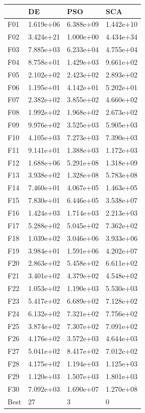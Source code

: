 \begin{tabular}{llll}
\toprule
{} &         DE &        PSO &        SCA \\
\midrule
F01  &  1.619e+06 &  6.388e+09 &  1.442e+10 \\
F02  &  3.424e+21 &  1.000e+00 &  4.434e+34 \\
F03  &  7.885e+03 &  6.233e+04 &  4.755e+04 \\
F04  &  8.758e+01 &  1.429e+03 &  9.661e+02 \\
F05  &  2.102e+02 &  2.423e+02 &  2.893e+02 \\
F06  &  1.195e+01 &  4.142e+01 &  5.202e+01 \\
F07  &  2.382e+02 &  3.855e+02 &  4.660e+02 \\
F08  &  1.992e+02 &  1.968e+02 &  2.673e+02 \\
F09  &  9.976e+02 &  3.525e+03 &  5.905e+03 \\
F10  &  4.105e+03 &  7.273e+03 &  7.390e+03 \\
F11  &  9.141e+01 &  1.388e+03 &  1.172e+03 \\
F12  &  1.688e+06 &  5.291e+08 &  1.318e+09 \\
F13  &  3.938e+02 &  1.328e+08 &  5.783e+08 \\
F14  &  7.460e+01 &  4.067e+05 &  1.463e+05 \\
F15  &  7.830e+01 &  6.446e+05 &  3.538e+07 \\
F16  &  1.424e+03 &  1.714e+03 &  2.213e+03 \\
F17  &  5.288e+02 &  5.045e+02 &  7.362e+02 \\
F18  &  1.039e+02 &  3.046e+06 &  3.933e+06 \\
F19  &  3.984e+01 &  1.591e+06 &  4.202e+07 \\
F20  &  2.863e+02 &  5.458e+02 &  6.611e+02 \\
F21  &  3.401e+02 &  4.379e+02 &  4.548e+02 \\
F22  &  1.053e+02 &  1.190e+03 &  5.530e+03 \\
F23  &  5.417e+02 &  6.689e+02 &  7.128e+02 \\
F24  &  6.132e+02 &  7.321e+02 &  7.756e+02 \\
F25  &  3.874e+02 &  7.307e+02 &  7.091e+02 \\
F26  &  4.176e+02 &  3.572e+03 &  4.644e+03 \\
F27  &  5.041e+02 &  8.417e+02 &  7.012e+02 \\
F28  &  4.175e+02 &  1.194e+03 &  1.125e+03 \\
F29  &  1.120e+03 &  1.507e+03 &  1.801e+03 \\
F30  &  7.092e+03 &  1.690e+07 &  1.270e+08 \\
Best &         27 &          3 &          0 \\
\bottomrule
\end{tabular}
